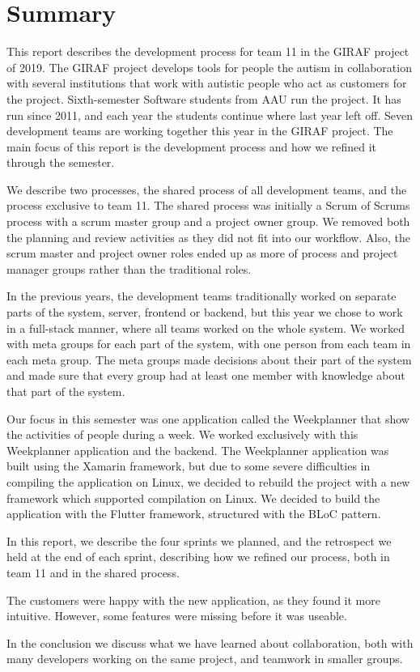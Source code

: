 \section{Summary}

This report describes the development process for team 11 in the GIRAF project of 2019. The GIRAF project develops tools for people the autism in collaboration with several institutions that work with autistic people who act as customers for the project. Sixth-semester Software students from AAU run the project. It has run since 2011, and each year the students continue where last year left off. Seven development teams are working together this year in the GIRAF project. The main focus of this report is the development process and how we refined it through the semester.

We describe two processes, the shared process of all development teams, and the process exclusive to team 11. The shared process was initially a Scrum of Scrums process with a scrum master group and a project owner group. We removed both the planning and review activities as they did not fit into our workflow. Also, the scrum master and project owner roles ended up as more of process and project manager groups rather than the traditional roles. 

In the previous years, the development teams traditionally worked on separate parts of the system, server, frontend or backend, but this year we chose to work in a full-stack manner, where all teams worked on the whole system. We worked with meta groups for each part of the system, with one person from each team in each meta group. The meta groups made decisions about their part of the system and made sure that every group had at least one member with knowledge about that part of the system. 

Our focus in this semester was one application called the Weekplanner that show the activities of people during a week. We worked exclusively with this Weekplanner application and the backend. The Weekplanner application was built using the Xamarin framework, but due to some severe difficulties in compiling the application on Linux, we decided to rebuild the project with a new framework which supported compilation on Linux. We decided to build the application with the Flutter framework, structured with the BLoC pattern. 

In this report, we describe the four sprints we planned, and the retrospect we held at the end of each sprint, describing how we refined our process, both in team 11 and in the shared process.

The customers were happy with the new application, as they found it more intuitive. However, some features were missing before it was useable. 

In the conclusion we discuss what we have learned about collaboration, both with many developers working on the same project, and teamwork in smaller groups. 

